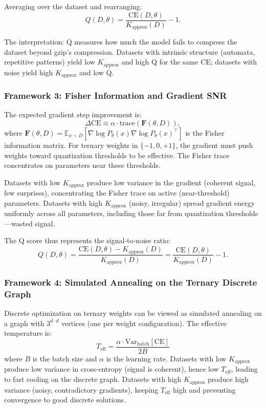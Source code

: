 \documentclass{article}
\begin{document}
Averaging over the dataset and rearranging:
\begin{equation}
  Q(D, \theta) = \frac{\mathrm{CE}(D, \theta)}{K_{\mathrm{approx}}(D)} - 1.
\end{equation}

The interpretation: Q measures how much the model fails to compress the dataset beyond gzip's compression. Datasets with intrinsic structure (automata, repetitive patterns) yield low $K_{\mathrm{approx}}$ and high Q for the same CE; datasets with noise yield high $K_{\mathrm{approx}}$ and low Q.

\subsubsection{Framework 3: Fisher Information and Gradient SNR}

The expected gradient step improvement is:
\begin{equation}
  \Delta \mathrm{CE} \approx \alpha \cdot \mathrm{trace}(\mathbf{F}(\theta, D)),
\end{equation}
where $\mathbf{F}(\theta, D) = \mathbb{E}_{x \sim D}[\nabla \log P_\theta(x) \nabla \log P_\theta(x)^\top]$ is the Fisher information matrix. For ternary weights in $\{-1, 0, +1\}$, the gradient must push weights toward quantization thresholds to be effective. The Fisher trace concentrates on parameters near these thresholds.

Datasets with low $K_{\mathrm{approx}}$ produce low variance in the gradient (coherent signal, few surprises), concentrating the Fisher trace on active (near-threshold) parameters. Datasets with high $K_{\mathrm{approx}}$ (noisy, irregular) spread gradient energy uniformly across all parameters, including those far from quantization thresholds---wasted signal.

The Q score thus represents the signal-to-noise ratio:
\begin{equation}
  Q(D, \theta) = \frac{\mathrm{CE}(D, \theta) - K_{\mathrm{approx}}(D)}{K_{\mathrm{approx}}(D)} = \frac{\mathrm{CE}(D, \theta)}{K_{\mathrm{approx}}(D)} - 1.
\end{equation}

\subsubsection{Framework 4: Simulated Annealing on the Ternary Discrete Graph}

Discrete optimization on ternary weights can be viewed as simulated annealing on a graph with $3^{d \cdot d}$ vertices (one per weight configuration). The effective temperature is:
\begin{equation}
  T_{\mathrm{eff}} = \frac{\alpha \cdot \mathrm{Var}_{\mathrm{batch}}[\mathrm{CE}]}{2 B}
\label{eq:t_eff}
\end{equation}
where $B$ is the batch size and $\alpha$ is the learning rate. Datasets with low $K_{\mathrm{approx}}$ produce low variance in cross-entropy (signal is coherent), hence low $T_{\mathrm{eff}}$, leading to fast cooling on the discrete graph. Datasets with high $K_{\mathrm{approx}}$ produce high variance (noisy, contradictory gradients), keeping $T_{\mathrm{eff}}$ high and preventing convergence to good discrete solutions.
\end{document}
